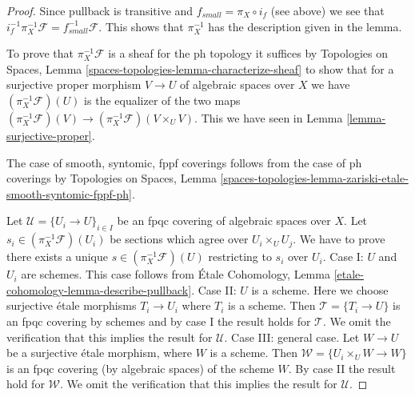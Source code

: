 \begin{proof}
Since pullback is transitive and $f_{small} = \pi_X \circ i_f$
(see above) we see that
$i_f^{-1} \pi_X^{-1}\mathcal{F} = f_{small}^{-1}\mathcal{F}$.
This shows that $\pi_X^{-1}$ has the description given in the lemma.

\medskip\noindent
To prove that $\pi_X^{-1}\mathcal{F}$ is a sheaf for the ph topology
it suffices by Topologies on Spaces, Lemma
\ref{spaces-topologies-lemma-characterize-sheaf}
to show that for a surjective proper morphism
$V \to U$ of algebraic spaces over $X$ we have
$(\pi_X^{-1}\mathcal{F})(U)$ is the equalizer of the two maps
$(\pi_X^{-1}\mathcal{F})(V) \to (\pi_X^{-1}\mathcal{F})(V \times_U V)$.
This we have seen in Lemma \ref{lemma-surjective-proper}.

\medskip\noindent
The case of smooth, syntomic, fppf coverings follows from the case
of ph coverings by Topologies on Spaces, Lemma
\ref{spaces-topologies-lemma-zariski-etale-smooth-syntomic-fppf-ph}.

\medskip\noindent
Let $\mathcal{U} = \{U_i \to U\}_{i \in I}$ be an fpqc covering of algebraic
spaces over $X$. Let $s_i \in (\pi_X^{-1}\mathcal{F})(U_i)$ be sections
which agree over $U_i \times_U U_j$. We have to prove there exists a unique
$s \in (\pi_X^{-1}\mathcal{F})(U)$ restricting to $s_i$ over $U_i$.
Case I: $U$ and $U_i$ are schemes. This case follows from
\'Etale Cohomology, Lemma \ref{etale-cohomology-lemma-describe-pullback}.
Case II: $U$ is a scheme. Here we choose surjective \'etale morphisms
$T_i \to U_i$ where $T_i$ is a scheme. Then $\mathcal{T} = \{T_i \to U\}$ is an
fpqc covering by schemes and by case I the result holds for $\mathcal{T}$.
We omit the verification that this implies the result for $\mathcal{U}$.
Case III: general case. Let $W \to U$ be a surjective \'etale
morphism, where $W$ is a scheme. Then $\mathcal{W} = \{U_i \times_U W \to W\}$
is an fpqc covering (by algebraic spaces) of the scheme $W$.
By case II the result hold for $\mathcal{W}$.
We omit the verification that this implies the result for $\mathcal{U}$.
\end{proof}

